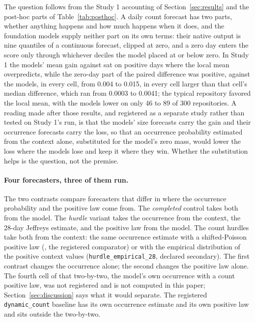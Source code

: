 The question follows from the Study 1 accounting of Section~\ref{sec:results} and the post-hoc parts of
Table~\ref{tab:posthoc}. A daily count forecast has two parts, whether anything happens and how much
happens when it does, and the foundation models supply neither part on its own terms: their native output
is nine quantiles of a continuous forecast, clipped at zero, and a zero day enters the score only through
whichever deciles the model placed at or below zero. In Study 1 the models' mean gain against \lm{} sat on
positive days where the local mean overpredicts, while the zero-day part of the paired difference was
positive, against the models, in every cell, from 0.004 to 0.015, in every cell larger than that cell's
median difference, which ran from 0.0003 to 0.0041; the typical repository favored the local mean, with the
models lower on only 46 to 89 of 300 repositories. A reading made after those results, and registered as a
separate study rather than tested on Study 1's run, is that the models' size forecasts carry the gain and
their occurrence forecasts carry the loss, so that an occurrence probability estimated from the context
alone, substituted for the model's zero mass, would lower the loss where the models lose and keep it where
they win. Whether the substitution helps is the question, not the premise.

\paragraph{Four forecasters, three of them run.} The two contrasts compare forecasters that differ in
where the occurrence probability and the positive law come from. The \emph{completed} control takes both
from the model. The \emph{hurdle} variant takes the occurrence from the context, the 28-day Jeffreys
estimate, and the positive law from the model. The count hurdles take both from the context: the same
occurrence estimate with a shifted-Poisson positive law (\hc{}, the registered comparator) or with the
empirical distribution of the positive context values (\texttt{hurdle\_empirical\_28}, declared secondary).
The first contrast changes the occurrence alone; the second changes the positive law alone. The fourth cell
of that two-by-two, the model's own occurrence with a count positive law, was not registered and is not
computed in this paper; Section~\ref{sec:discussion} says what it would separate. The registered
\texttt{dynamic\_count} baseline has its own occurrence estimate and its own positive law and sits outside
the two-by-two.

